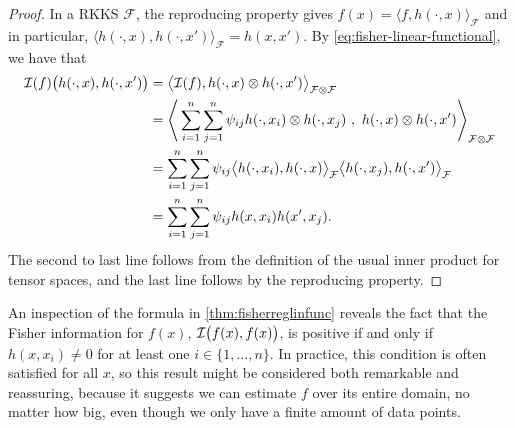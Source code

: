 \begin{proof}
  In a RKKS $\mathcal F$, the reproducing property gives $f(x) = \langle f, h(\cdot, x) \rangle_{\mathcal F}$ and in particular, $\langle h(\cdot,x), h(\cdot, x') \rangle_{\mathcal F} = h(x,x')$. 
  By \cref{eq:fisher-linear-functional}, we have that
  \begin{align*}
    {\mathcal I}(f)\big(h(\cdot,x),h(\cdot,x') \big)
    &= \big\langle {\mathcal I}(f), h(\cdot, x) \otimes h(\cdot, x') \big\rangle_{\mathcal F \otimes \mathcal F} \\
    &= \Bigg\langle \sum_{i=1}^n\sum_{j=1}^n \psi_{ij} h(\cdot,x_i) \otimes h(\cdot,x_j) \ , \ h(\cdot, x) \otimes h(\cdot, x') \Bigg\rangle_{\mathcal F \otimes \mathcal F} \\
    &= \sum_{i=1}^n\sum_{j=1}^n \psi_{ij} \big\langle h(\cdot,x_i), h(\cdot, x) \big\rangle_{\mathcal F} \big\langle h(\cdot,x_j), h(\cdot, x') \big\rangle_{\mathcal F } \\
    &= \sum_{i=1}^n\sum_{j=1}^n \psi_{ij} h(x,x_i) h(x', x_j).
  \end{align*}
  The second to last line follows from the definition of the usual inner product for tensor spaces, and the last line follows by the reproducing property.
\end{proof}

An inspection of the formula in \cref{thm:fisherreglinfunc} reveals the fact that the Fisher information for $f(x)$, ${\mathcal I} \big(f(x),f(x) \big)$, is positive if and only if $h(x,x_i)\neq 0$ for at least one $i \in \{1,\dots,n \}$.
In practice, this condition is often satisfied for all $x$, so this result might be considered both remarkable and reassuring, because it suggests we can estimate $f$ over its entire domain, no matter how big, even though we only have a finite amount of data points.
